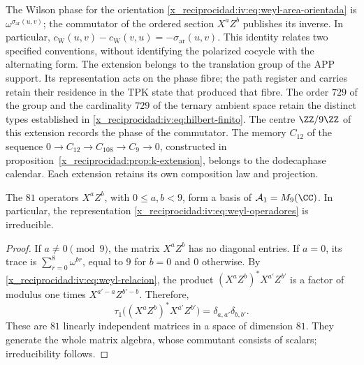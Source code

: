 The Wilson phase for the orientation
\eqref{x_reciprocidad:iv:eq:weyl-area-orientada} is
\(\omega^{\sigma_{\mathrm{ar}}(u,v)}\); the commutator of the
ordered section \(X^aZ^b\) publishes its inverse. In particular,
\(c_{\mathrm W}(u,v)-c_{\mathrm W}(v,u)
=-\sigma_{\mathrm{ar}}(u,v)\).
This identity relates two specified conventions, without identifying
the polarized cocycle with the alternating form. The extension belongs
to the translation group of the APP support. Its representation acts on
the phase fibre; the path register and carries retain
their residence in the TPK state that produced that fibre. The order \(729\)
of the group and the cardinality \(729\) of the ternary ambient space retain the
distinct types established in \eqref{x_reciprocidad:iv:eq:hilbert-finito}.
The centre \(\ZZ/9\ZZ\) of this extension records the phase
of the commutator. The memory \(C_{12}\) of the sequence
\(0\to C_{12}\to C_{108}\to C_9\to0\), constructed in
proposition~\ref{x_reciprocidad:prop:k-extension}, belongs to the dodecaphase
calendar. Each extension retains its own composition law and
projection.

\begin{proposition}
\label{x_reciprocidad:iv:prop:weyl-completo}
The \(81\) operators \(X^aZ^b\), with \(0\leq a,b<9\), form
a basis of \(\mathcal A_1=M_9(\CC)\). In particular, the
representation \eqref{x_reciprocidad:iv:eq:weyl-operadores} is irreducible.
\end{proposition}
\begin{proof}
If \(a\neq0\pmod9\), the matrix \(X^aZ^b\) has no diagonal
entries. If \(a=0\), its trace is
\(\sum_{r=0}^8\omega^{br}\), equal to \(9\) for \(b=0\) and
\(0\) otherwise. By \eqref{x_reciprocidad:iv:eq:weyl-relacion}, the
product \((X^aZ^b)^*X^{a'}Z^{b'}\) is a factor of modulus one
times \(X^{a'-a}Z^{b'-b}\). Therefore,
\[
 \tau_1\bigl((X^aZ^b)^*X^{a'}Z^{b'}\bigr)
 =\delta_{a,a'}\delta_{b,b'}.
\]
These are \(81\) linearly independent matrices in a space of
dimension \(81\). They generate the whole matrix algebra, whose commutant
consists of scalars; irreducibility follows.
\end{proof}

